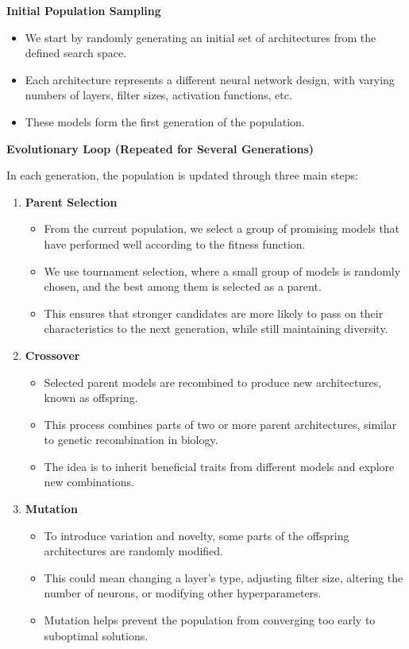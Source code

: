 \textbf{Initial Population Sampling}
\begin{itemize}
    \item We start by randomly generating an initial set of architectures from the defined search space.
    \item Each architecture represents a different neural network design, with varying numbers of layers, filter sizes, activation functions, etc.
    \item These models form the first generation of the population.


\end{itemize}

\textbf{Evolutionary Loop (Repeated for Several Generations)}

In each generation, the population is updated through three main steps:
\begin{enumerate}
    \item \textbf{Parent Selection}
    \begin{itemize}
        \item From the current population, we select a group of promising models that have performed well according to the fitness function.
        \item We use tournament selection, where a small group of models is randomly chosen, and the best among them is selected as a parent.
        \item This ensures that stronger candidates are more likely to pass on their characteristics to the next generation, while still maintaining diversity.
    \end{itemize}
    \item \textbf{Crossover}
    \begin{itemize}
        \item Selected parent models are recombined to produce new architectures, known as offspring.
        \item This process combines parts of two or more parent architectures, similar to genetic recombination in biology.
        \item The idea is to inherit beneficial traits from different models and explore new combinations.


    \end{itemize}
    \item \textbf{Mutation}
    \begin{itemize}
        \item To introduce variation and novelty, some parts of the offspring architectures are randomly modified.
        \item This could mean changing a layer’s type, adjusting filter size, altering the number of neurons, or modifying other hyperparameters.
        \item Mutation helps prevent the population from converging too early to suboptimal solutions.


    \end{itemize}
\end{enumerate}
  
